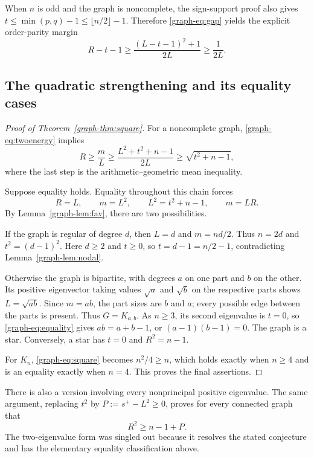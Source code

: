 \documentclass[11pt,a4paper]{article}
\theoremstyle{remark}\newtheorem{remark}[theorem]{Remark}
\numberwithin{equation}{section}
\begin{document}
When $n$ is odd and the graph is noncomplete, the sign-support proof
also gives $t\le\min(p,q)-1\le\lfloor n/2\rfloor-1$. Therefore
\eqref{graph-eq:gap} yields the explicit order-parity margin
\[
 R-t-1\ge\frac{(L-t-1)^2+1}{2L}\ge\frac1{2L}.
\]

\subsection{The quadratic strengthening and its equality cases}
\begin{proof}[Proof of Theorem~\ref{graph-thm:square}]
For a noncomplete graph, \eqref{graph-eq:twoenergy} implies
\[
 R\ge\frac mL\ge\frac{L^2+t^2+n-1}{2L}
                \ge\sqrt{t^2+n-1},
\]
where the last step is the arithmetic--geometric mean inequality.

Suppose equality holds. Equality throughout this chain forces
\begin{equation}\label{graph-eq:equality}
 R=L,\qquad m=L^2,\qquad L^2=t^2+n-1,
 \qquad m=LR.
\end{equation}
By Lemma~\ref{graph-lem:fav}, there are two possibilities.

If the graph is regular of degree $d$, then $L=d$ and $m=nd/2$.
Thus $n=2d$ and $t^2=(d-1)^2$. Here $d\ge2$ and $t\ge0$, so
$t=d-1=n/2-1$, contradicting Lemma~\ref{graph-lem:nodal}.

Otherwise the graph is bipartite, with degrees $a$ on one part and
$b$ on the other. Its positive eigenvector taking values $\sqrt a$
and $\sqrt b$ on the respective parts shows $L=\sqrt{ab}$.
Since $m=ab$, the part sizes are $b$ and $a$; every possible edge
between the parts is present. Thus $G=K_{a,b}$. As $n\ge3$, its
second eigenvalue is $t=0$, so \eqref{graph-eq:equality} gives
$ab=a+b-1$, or $(a-1)(b-1)=0$. The graph is a star.
Conversely, a star has $t=0$ and $R^2=n-1$.

For $K_n$, \eqref{graph-eq:square} becomes $n^2/4\ge n$, which holds
exactly when $n\ge4$ and is an equality exactly when $n=4$.
This proves the final assertions.
\end{proof}

There is also a version involving every nonprincipal positive
eigenvalue. The same argument, replacing $t^2$ by
$P:=s^+-L^2\ge0$, proves for every connected graph that
\[
                         R^2\ge n-1+P.
\]
The two-eigenvalue form was singled out because it resolves the
stated conjecture and has the elementary equality classification above.
\end{document}
